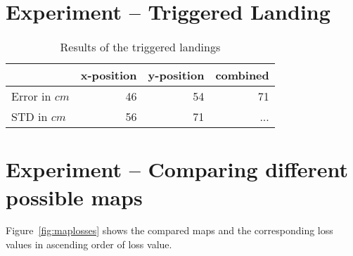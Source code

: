 \section{Experiment -- Triggered Landing}
\label{sec:experiment-4}

\begin{table}[H]
  \centering
  \begin{tabular}{lrrr}
    \toprule
    & x-position & y-position & combined\\
    \midrule
    Error in $cm$ & 46 & 54 & 71\\
    STD in $cm$ & 56 & 71  & ...\\
    \bottomrule
  \end{tabular}
  \caption[Triggered landings]{Results of the triggered landings}
  \label{tab:targetlanding}

\end{table}

\section{Experiment -- Comparing different possible maps}
\label{sec:experiment-6}

Figure~\ref{fig:maplosses} shows the compared maps and the
corresponding loss values in ascending order of loss value.